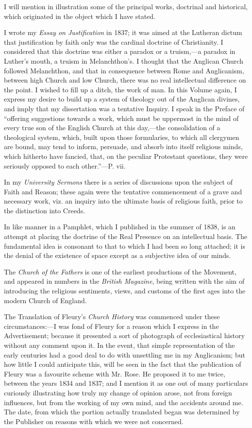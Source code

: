 I will mention in illustration some of the principal works, doctrinal
and historical, which originated in the object which I have stated.

I wrote my \emph{Essay on Justification} in 1837; it was aimed at the
Lutheran dictum that justification by faith only was the cardinal
doctrine of Christianity. I considered that this doctrine was either a
paradox or a truism,—a paradox in Luther's mouth, a truism in
Melanchthon's. I thought that the Anglican Church followed
Melanchthon, and that in consequence between Rome and Anglicanism,
between high Church and low Church, there was no real intellectual
difference on the point. I wished to fill up a ditch, the work of man.
In this Volume again, I express my desire to build up a system of
theology out of the Anglican divines, and imply that my dissertation was
a tentative Inquiry. I speak in the Preface of ``offering
suggestions towards a work, which must be uppermost in the mind of
every true son of the English Church at this day,—the consolidation of
a theological system, which, built upon those formularies, to which all
clergymen are bound, may tend to inform, persuade, and absorb into
itself religious minds, which hitherto have fancied, that, on the
peculiar Protestant questions, they were seriously opposed to each
other.''—P. vii.

In my \emph{University Sermons} there is a series of discussions upon the
subject of Faith and Reason; these again were the tentative commencement
of a grave and necessary work, viz. an inquiry into the
ultimate basis of religious faith, prior to the distinction into Creeds.

In like manner in a Pamphlet, which I published in the summer of 1838,
is an attempt at placing the doctrine of the Real Presence on an
intellectual basis. The fundamental idea is consonant to that to which I
had been so long attached; it is the denial of the existence of space
except as a subjective idea of our minds.

The \emph{Church of the Fathers} is one of the earliest productions of the
Movement, and appeared in numbers in the \emph{British Magazine}, being
written with the aim of introducing the religious sentiments, views,
and customs of the first ages into the modern Church of England.

The Translation of Fleury's \emph{Church History} was commenced under these
circumstances:—I was fond of Fleury for a reason which I express in
the Advertisement; because it presented a sort of photograph of
ecclesiastical history without any comment upon it. In the event, that
simple representation of the early centuries had a good deal to do with
unsettling me in my Anglicanism; but how little I could
anticipate this, will be seen in the fact that the publication of
Fleury was a favourite scheme with Mr. Rose. He proposed
it to me twice, between the years 1834 and 1837; and I mention it as one
out of many particulars curiously illustrating how truly my change of
opinion arose, not from foreign influences, but from the working of my
own mind, and the accidents around me. The date, from which the
portion actually translated began was determined by the Publisher
on reasons with which we were not concerned.

